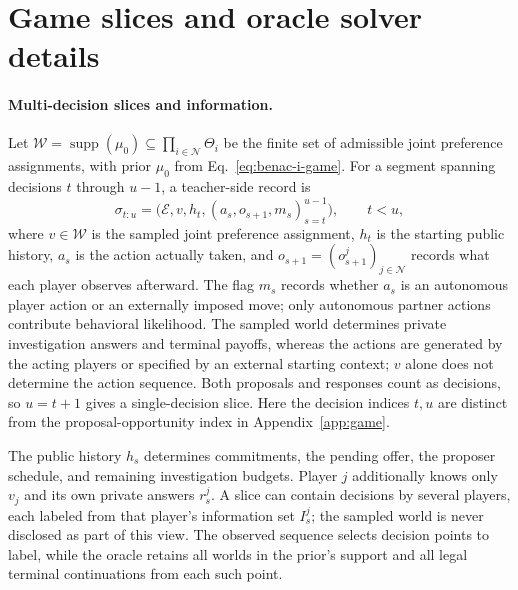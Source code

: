 

\section{Game slices and oracle solver details}
\label{app:oracle}

\paragraph{Multi-decision slices and information.}
Let $\mathcal W=\operatorname{supp}(\mu_0)\subseteq\prod_{i\in\mathcal N}\Theta_i$
be the finite set of admissible joint preference assignments, with prior $\mu_0$ from
Eq.~\ref{eq:benac-i-game}. For a segment spanning decisions $t$ through
$u-1$, a teacher-side record is
\begin{equation}
 \sigma_{t:u}=\bigl(\mathcal E,v,h_t,
 (a_s,o_{s+1},m_s)_{s=t}^{u-1}\bigr),\qquad t<u,
 \label{eq:game-slice}
\end{equation}
where $v\in\mathcal W$ is the sampled joint preference assignment, $h_t$ is
the starting public history, $a_s$ is the action actually taken, and
$o_{s+1}=(o_{s+1}^j)_{j\in\mathcal N}$ records what each player observes
afterward. The flag $m_s$ records whether $a_s$ is an autonomous player
action or an externally imposed move; only autonomous partner actions
contribute behavioral likelihood. The sampled world determines private investigation
answers and terminal payoffs, whereas the actions are generated by the acting
players or specified by an external starting context; $v$ alone does not
determine the action sequence. Both proposals and responses count as decisions, so
$u=t+1$ gives a single-decision slice.
Here the decision indices $t,u$ are distinct from the proposal-opportunity
index in Appendix~\ref{app:game}.

The public history $h_s$ determines commitments, the pending offer, the
proposer schedule, and remaining investigation budgets. Player $j$
additionally knows only $v_j$ and its own private answers $r_s^j$. A slice
can contain decisions by several players, each labeled from that player's
information set $I_s^j$; the sampled world is never disclosed as part of
this view. The observed sequence selects decision points to label, while
the oracle retains all worlds in the prior's support and all legal terminal
continuations from each such point.

